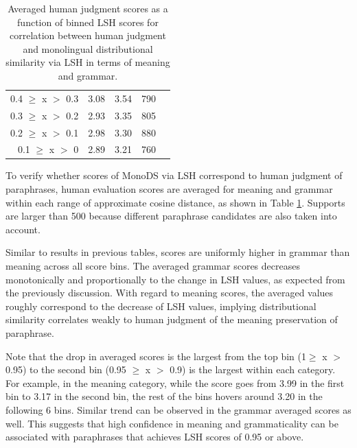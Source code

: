 \documentclass[11pt]{article}
\begin{document}
\begin{table}
\begin{center}
\begin{tabular}{rcccc}
{\scriptsize 0.4 $\geq$ x $>$ 0.3} & {\scriptsize 3.08} & {\scriptsize 3.54} & {\scriptsize 790}  \\
{\scriptsize 0.3 $\geq$ x $>$ 0.2} & {\scriptsize 2.93} & {\scriptsize 3.35} & {\scriptsize 805}  \\
{\scriptsize 0.2 $\geq$ x $>$ 0.1} & {\scriptsize 2.98} & {\scriptsize 3.30} & {\scriptsize 880}  \\
{\scriptsize 0.1 $\geq$ x $>$ 0} & {\scriptsize 2.89} & {\scriptsize 3.21} & {\scriptsize 760}  \\
\hline
\end{tabular}
\end{center}
\caption{Averaged human judgment scores as a function of binned LSH scores for correlation between human judgment and monolingual distributional similarity via LSH in terms of meaning and grammar.}
\label{table9}
\end{table}

To verify whether scores of MonoDS via LSH correspond to human judgment of paraphrases, human evaluation scores are averaged for meaning and grammar within each range of approximate cosine distance, as shown in Table \ref{table9}. Supports are larger than 500 because different paraphrase candidates are also taken into account.

Similar to results in previous tables, scores are uniformly higher in grammar than meaning across all score bins. The averaged grammar scores decreases monotonically and proportionally to the change in LSH values, as expected from the previously discussion. With regard to meaning scores, the averaged values roughly correspond to the decrease of LSH values, implying distributional similarity correlates weakly to human judgment of the meaning preservation of paraphrase. 

Note that the drop in averaged scores is the largest from the top bin (1$\geq$ x $>$ 0.95) to the second bin (0.95 $\geq$ x $>$ 0.9) is the largest within each category. For example, in the meaning category, while the score goes from 3.99 in the first bin to 3.17 in the second bin, the rest of the bins hovers around 3.20 in the following 6 bins. Similar trend can be observed in the grammar averaged scores as well. This suggests that high confidence in meaning and grammaticality can be associated with paraphrases that achieves LSH scores of 0.95 or above.
\end{document}
